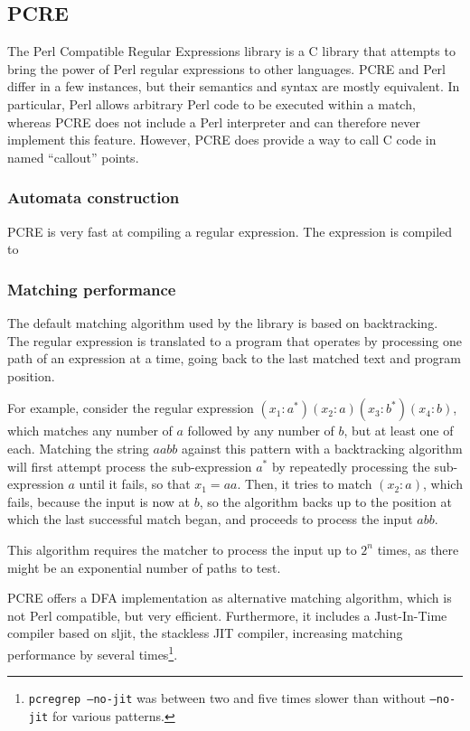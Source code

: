 \subsection{PCRE}

The Perl Compatible Regular Expressions library is a C library that attempts to
bring the power of Perl regular expressions to other languages. PCRE and Perl
differ in a few instances, but their semantics and syntax are mostly equivalent.
In particular, Perl allows arbitrary Perl code to be executed within a match,
whereas PCRE does not include a Perl interpreter and can therefore never
implement this feature. However, PCRE does provide a way to call C code in named
``callout'' points.

\subsubsection{Automata construction}

PCRE is very fast at compiling a regular expression. The expression is compiled
to 


\subsubsection{Matching performance}

The default matching algorithm used by the library is based on backtracking. The
regular expression is translated to a program that operates by processing one
path of an expression at a time, going back to the last matched text and program
position.

For example, consider the regular expression $(x_1:a^*)(x_2:a)(x_3:b^*)(x_4:b)$,
which matches any number of $a$ followed by any number of $b$, but at least one
of each. Matching the string $aabb$ against this pattern with a backtracking
algorithm will first attempt process the sub-expression $a^*$ by repeatedly
processing the sub-expression $a$ until it fails, so that $x_1 = aa$. Then, it
tries to match $(x_2:a)$, which fails, because the input is now at $b$, so the
algorithm backs up to the position at which the last successful match began, and
proceeds to process the input $abb$.

This algorithm requires the matcher to process the input up to $2^n$ times, as
there might be an exponential number of paths to test.

PCRE offers a DFA implementation as alternative matching algorithm, which is not
Perl compatible, but very efficient. Furthermore, it includes a Just-In-Time
compiler based on sljit, the stackless JIT compiler, increasing matching
performance by several times\footnote{\texttt{pcregrep --no-jit} was between two
and five times slower than without \texttt{--no-jit} for various patterns.}.

